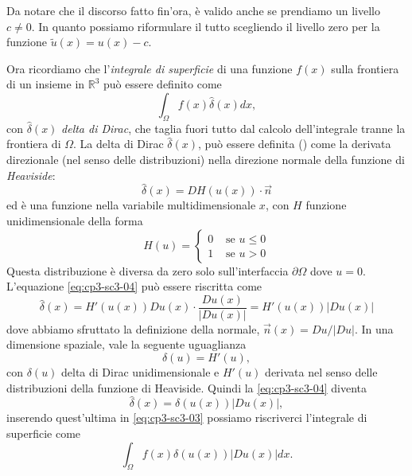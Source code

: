 \begin{osservazione}
  \label{oss:cp3-sc3-01}
Da notare che il discorso fatto fin'ora, è valido anche se prendiamo
un livello $c\ne 0$. In quanto possiamo riformulare il tutto
scegliendo il livello zero per la funzione  $\tilde{u}(x)=u(x)-c$.
\end{osservazione}
Ora ricordiamo che l'\emph{integrale di superficie} di una funzione
$f(x)$ sulla frontiera di un insieme in $\mathbb{R}^3$ può essere definito come \cite[vedi][§1.5]{osher:fed}
\begin{equation}
  \label{eq:cp3-sc3-03}
  \int_{\Omega}f(x)\hat{\delta}(x)dx,
\end{equation}
con $\hat{\delta}(x)$  \emph{delta di Dirac}, che taglia
fuori tutto dal calcolo dell'integrale tranne la frontiera di
$\Omega$. La delta di Dirac $\hat{\delta}(x)$, può essere definita
(\cite[vedi][§1.5]{osher:fed}) come la
derivata direzionale (nel senso delle distribuzioni) nella direzione normale della funzione di \emph{Heaviside}:
\begin{equation}
  \label{eq:cp3-sc3-04}
  \hat{\delta}(x)=DH(u(x))\cdot\vec{n}
\end{equation}
ed è una funzione nella variabile multidimensionale $x$, con $H$
funzione unidimensionale della forma 
\begin{equation}
\label{eq:cp3-sc3-1-add-01}
H(u)=
\begin{cases}
  0 &\text{ se $u\leq 0$} \\
  1 &\text{ se $u>0$}
\end{cases}
\end{equation}
Questa distribuzione è diversa da zero solo sull'interfaccia $\partial\Omega$
dove $u=0$. L'equazione \eqref{eq:cp3-sc3-04} può essere riscritta come
\[
\hat{\delta}(x) = H'(u(x))Du(x)\cdot\frac{Du(x)}{|Du(x)|}=H'(u(x))|Du(x)|
\]
dove abbiamo sfruttato la definizione della normale,
$\vec{n}(x)=Du/|Du|$. In una dimensione spaziale, vale la seguente uguaglianza
\[
\delta(u)=H'(u),
\]
con $\delta(u)$ delta di Dirac unidimensionale e $H'(u)$ derivata nel
senso delle distribuzioni della funzione di Heaviside.
Quindi la \eqref{eq:cp3-sc3-04} diventa
\begin{equation}
  \label{eq:cp3-sc3-05}
  \hat{\delta}(x)=\delta(u(x))|Du(x)|,
\end{equation}
inserendo quest'ultima in \eqref{eq:cp3-sc3-03} possiamo riscriverci l'integrale di superficie come 
\begin{equation}
  \label{eq:cp3-sc3-06}
  \int_{\Omega}f(x)\delta(u(x))|Du(x)|dx.
\end{equation}

